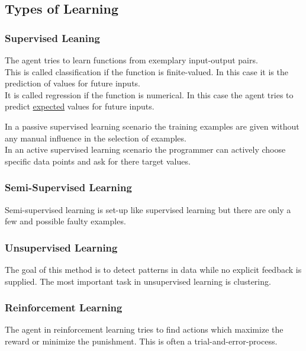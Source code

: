 \documentclass{panikzettel}
\begin{document}
\subsection{Types of Learning}
\subsubsection{Supervised Leaning}
The agent tries to learn functions from exemplary input-output pairs.\\
This is called classification if the function is finite-valued. In this case it is the prediction of values for future inputs.\\
It is called regression if the function is numerical. In this case the agent tries to predict \underline{expected} values for future inputs.

In a passive supervised learning scenario the training examples are given without any manual influence in the selection of examples.\\
In an active supervised learning scenario the programmer can actively choose specific data points and ask for there target values.

%


\subsubsection{Semi-Supervised Learning}
Semi-supervised learning is set-up like supervised learning but there are only a few and possible faulty examples.

\subsubsection{Unsupervised Learning}
The goal of this method is to detect patterns in data while no explicit feedback is supplied. The most important task in unsupervised learning is clustering.

\subsubsection{Reinforcement Learning}
The agent in reinforcement learning tries to find actions which maximize the reward or minimize the punishment. This is often a trial-and-error-process.
\end{document}
